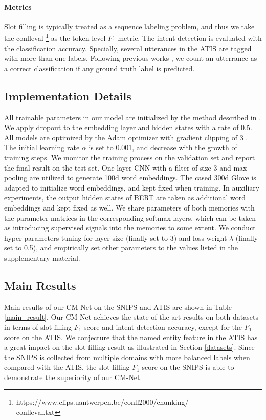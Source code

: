 \documentclass[11pt,a4paper]{article}
\begin{document}
\paragraph{Metrics} 
Slot filling is typically treated as a sequence labeling problem, and thus we take the conlleval \footnote{https://www.clips.uantwerpen.be/conll2000/chunking/\\conlleval.txt} as the token-level $F_1$  metric. The intent detection is evaluated with the classification accuracy. Specially, several utterances in the ATIS are tagged with more than one labels. Following previous works \cite{atis_2010,a_joint_2016}, we count an utterrance as a correct classification if any ground truth label is predicted.

\subsection{Implementation Details}

All trainable parameters in our model are initialized by the method described in \citeauthor{Xavier} . We apply dropout \cite{dropout} to the embedding layer and hidden states with a rate of 0.5. All models are optimized by the Adam optimizer \cite{Adam} with gradient clipping of 3 \cite{gradient_clip}. 
The initial learning rate $\alpha$ is set to 0.001, and decrease with the growth of training steps. We monitor the training process on the validation set and report the final result on the test set. 
One layer CNN with a filter of size 3 and max pooling are utilized to generate 100d word embeddings. The cased 300d Glove is adapted to initialize word embeddings, and kept fixed when training. In auxiliary experiments, the output hidden states of BERT are taken as additional word embeddings and kept fixed as well. We share parameters of both memories with the parameter matrices in the corresponding softmax layers, which can be taken as introducing supervised signals into the memories to some extent. We conduct hyper-parameters tuning for layer size (finally set to 3) and loss weight $\lambda$ (finally set to 0.5), and empirically set other parameters to the values listed in the supplementary material.

\subsection{Main Results}
Main results of our CM-Net on the SNIPS and ATIS are shown in Table \ref{main_result}. Our CM-Net achieves the state-of-the-art results on both datasets in terms of slot filling $F_1$ score and intent detection accuracy, except for the $F_1$ score on the ATIS. We conjecture that the named entity feature in the ATIS has a great impact on the slot filling result as illustrated in Section \ref{datasets}. Since the SNIPS is collected from multiple domains with more balanced labels when compared with the ATIS, the slot filling $F_1$ score on the SNIPS is able to demonstrate the superiority of our CM-Net.
\end{document}

